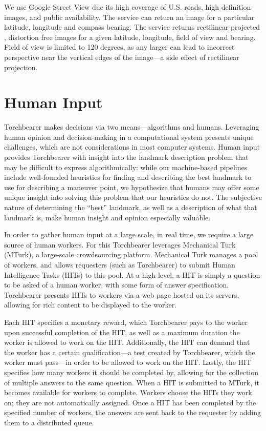 We use Google Street View due its high coverage of U.S. roads, high definition images, and public availability. The service can return an image for a particular latitude, longitude and compass bearing. The service returns rectilinear-projected \cite{agarwal2015metric}, distortion free images for a given latitude, longitude, field of view and bearing. Field of view is limited to 120 degrees, as any larger can lead to incorrect perspective near the vertical edges of the image---a side effect of rectilinear projection.
 
\section{Human Input}
Torchbearer makes decisions via two means---algorithms and humans. Leveraging human opinion and decision-making in a computational system presents unique challenges, which are not considerations in most computer systems. Human input provides Torchbearer with insight into the landmark description problem that may be difficult to express algorithmically: while our machine-based pipelines include well-founded heuristics for finding and describing the best landmark to use for describing a maneuver point, we hypothesize that humans may offer some unique insight into solving this problem that our heuristics do not. The subjective nature of determining the “best” landmark, as well as a description of what that landmark is, make human insight and opinion especially valuable. 

In order to gather human input at a large scale, in real time, we require a large source of human workers. For this Torchbearer leverages Mechanical Turk (MTurk), a large-scale crowdsourcing platform. Mechanical Turk manages a pool of workers, and allows requesters (such as Torchbearer) to submit Human Intelligence Tasks (HITs) to this pool. At a high level, a HIT is simply a question to be asked of a human worker, with some form of answer specification. Torchbearer presents HITs to workers via a web page hosted on its servers, allowing for rich content to be displayed to the worker.

Each HIT specifies a monetary reward, which Torchbearer pays to the worker upon successful completion of the HIT, as well as a maximum duration the worker is allowed to work on the HIT. Additionally, the HIT can demand that the worker has a certain qualification---a test created by Torchbearer, which the worker must pass---in order to be allowed to work on the HIT.  Lastly, the HIT specifies how many workers it should be completed by, allowing for the collection of multiple answers to the same question. When a HIT is submitted to MTurk, it becomes available for workers to complete. Workers choose the HITs they work on; they are not automatically assigned. Once a HIT has been completed by the specified number of workers, the answers are sent back to the requester by adding them to a distributed queue.

